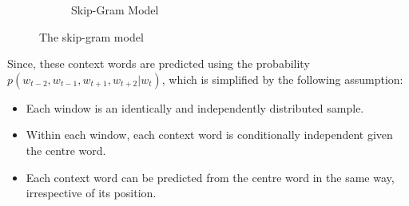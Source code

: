 \begin{figure}[H]
\begin{subfigure}{0.5\linewidth}
{
   }       \caption{Skip-Gram Model}
	   \end{subfigure}
	   \caption{The skip-gram model}
	   \label{fig:skipgram}
   \end{figure}

   Since, these context words are predicted using the probability $p(w_{t-2}, w_{t-1}, w_{t+1}, w_{t+2} | w_t)$, which is simplified by the following assumption:
   \begin{itemize}
	   \item Each window is an identically and independently distributed sample.
	   \item Within each window, each context word is conditionally independent given the centre word.
	   \item Each context word can be predicted from the centre word in the same way, irrespective of its position.
   \end{itemize}

